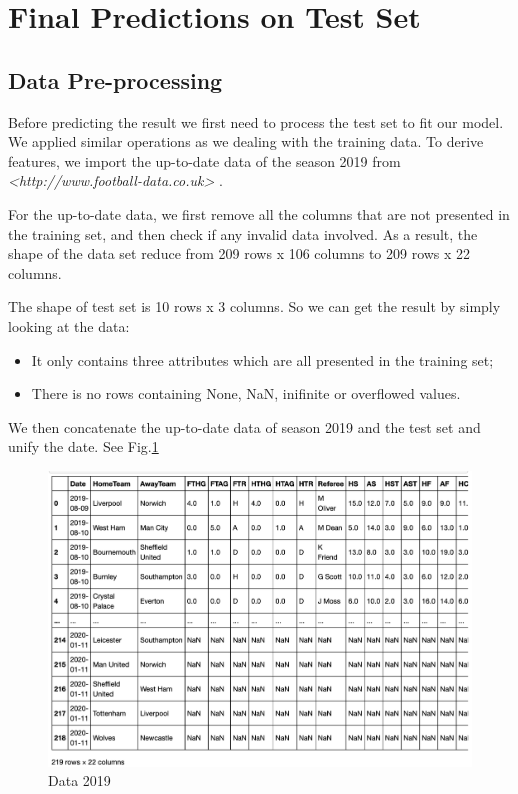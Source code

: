 \documentclass{article}
\begin{document}
\section{Final Predictions on Test Set}
\subsection{Data Pre-processing}

Before predicting the result we first need to process the test set to fit our model. We applied similar operations as we dealing with the training data. To derive features, we import the up-to-date data of the season 2019 from {\em<http://www.football-data.co.uk>} .

For the up-to-date data, we first remove all the columns that are not presented in the training set, and then check if any invalid data involved.  As a result, the shape of the data set reduce from 209 rows x 106 columns to 209 rows x 22 columns.

The shape of test set is 10 rows x 3 columns. So we can get the result by simply looking at the data:
\begin{itemize}
\item It only contains three attributes which are all presented in the training set;
\item There is no rows containing None, NaN, inifinite or overflowed values.
\end{itemize}

We then concatenate the up-to-date data of season 2019 and the test set and unify the date. See Fig.\ref{fig:rawData2019}
\begin{figure}[ht]
\centering
\includegraphics[scale=0.45]{graphs/rawData2019.png}
\caption{Data 2019}
\label{fig:rawData2019}
\end{figure}
\end{document}
